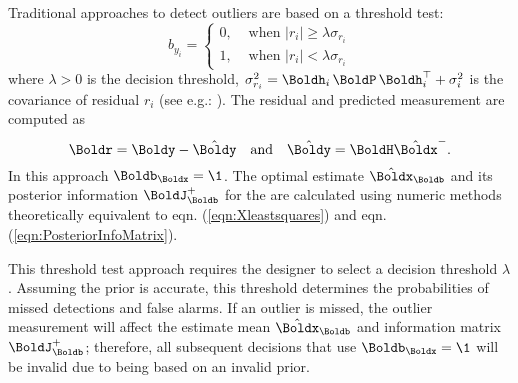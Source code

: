 
\blue
Traditional approaches  to detect outliers are based on a threshold test:
\begin{equation} \label{eqn:threshold_test}
	b_{y_i} = \left\{
	\begin{array}{ll}
		0, & \mbox{ when }{|r_i|} \ge \lambda\sigma_{r_i}\\
		1, & \mbox{ when }{|r_i|} <   \lambda\sigma_{r_i}
	\end{array}
	\right.
\end{equation}
where $\lambda>0$ is the decision threshold, 
	$\sigma_{r_i}^2= {\Boldh_i \, \BoldP \, \Boldh_i^\top + \sigma_{i}^2}$ 
is the covariance of residual $r_i$ (see e.g.: \cite{fisher1992ical,neyman1933testing,frank1997survey,willsky1976survey,patton1994review}).
The residual and predicted measurement are computed as
\begin{equation} \label{eqn:residual} 
\Boldr =  \Boldy - \hat{\Boldy} 
~~	\mbox{ and } ~~	
\hat{\Boldy} = \BoldH \hat{\Boldx}^-. 
\end{equation}
In this approach $\Boldb_{\Boldx} = \1$.
The optimal estimate $\hat{\Boldx}_\Boldb$ and its posterior information $\BoldJ_{\Boldb}^{+}$ for the are  calculated using numeric methods theoretically equivalent to  eqn. (\ref{eqn:Xleastsquares}) and eqn. (\ref{eqn:PosteriorInfoMatrix}).

This threshold test approach requires the designer to select a decision threshold  $\lambda$. 
Assuming the prior is accurate, this threshold determines the probabilities of missed detections and false alarms. 
If an outlier is missed, the outlier measurement will affect the estimate mean $\hat{\Boldx}_\Boldb$ and information matrix $\BoldJ_{\Boldb}^+$; therefore, all subsequent decisions that use  $\Boldb_{\Boldx} = \1$ will be invalid due to being based on an invalid prior.

\black
